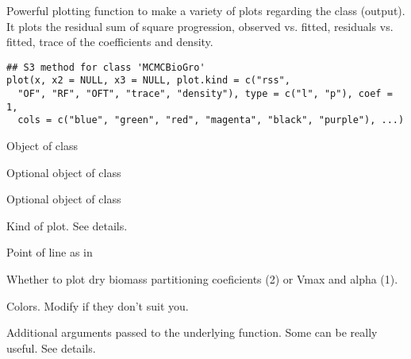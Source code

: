 \documentclass[letterpaper]{book}
\begin{document}
%
\begin{SeeAlso}\relax
{} 
\end{SeeAlso}
%
\begin{Description}\relax
Powerful plotting function to make a variety of plots
regarding the  class (output). It plots
the residual sum of square progression, observed vs.
fitted, residuals vs. fitted, trace of the coefficients and
density.
\end{Description}
%
\begin{Usage}
\begin{verbatim}
## S3 method for class 'MCMCBioGro'
plot(x, x2 = NULL, x3 = NULL, plot.kind = c("rss",
  "OF", "RF", "OFT", "trace", "density"), type = c("l", "p"), coef = 1,
  cols = c("blue", "green", "red", "magenta", "black", "purple"), ...)
\end{verbatim}
\end{Usage}
%
\begin{Arguments}
\begin{ldescription}
\item[\code{x}] Object of class 

\item[\code{x2}] Optional object of class 

\item[\code{x3}] Optional object of class 

\item[\code{plot.kind}] Kind of plot. See details.

\item[\code{type}] Point of line as in 

\item[\code{coef}] Whether to plot dry biomass partitioning
coeficients (2) or Vmax and alpha (1).

\item[\code{cols}] Colors. Modify if they don't suit you.

\item[\code{...}] Additional arguments passed to the
underlying  function. Some can be really
useful. See details.
\end{ldescription}
\end{Arguments}
%
\end{document}
